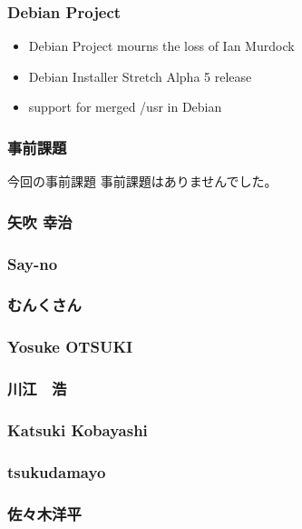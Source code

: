 \documentclass[cjk,dvipdfmx,10pt,compress,%
hyperref={bookmarks=true,bookmarksnumbered=true,bookmarksopen=false,%
colorlinks=false,%
pdftitle={第 106 回 関西 Debian 勉強会},%
pdfauthor={倉敷・のがた・佐々木・かわだ},%
pdfsubject={資料},%
}]{beamer}
\begin{document}
\begin{frame}[fragile]
  \frametitle{Debian Project}
  \begin{itemize}
  \item Debian Project mourns the loss of Ian Murdock
  \item Debian Installer Stretch Alpha 5 release
  \item support for merged /usr in Debian
  \end{itemize}
\end{frame}



\begin{frame}[fragile]
  \frametitle{事前課題}
  \begin{block}{今回の事前課題}
    事前課題はありませんでした。
  \end{block}
\end{frame}


\begin{frame}
  \frametitle{ 矢吹 幸治 }
\end{frame}

\begin{frame}
  \frametitle{ Say-no }
\end{frame}

\begin{frame}
  \frametitle{ むんくさん }
\end{frame}

\begin{frame}
  \frametitle{ Yosuke OTSUKI }
\end{frame}

\begin{frame}
  \frametitle{ 川江　浩 }
\end{frame}

\begin{frame}
  \frametitle{ Katsuki Kobayashi }
\end{frame}

\begin{frame}
  \frametitle{ tsukudamayo }
\end{frame}

\begin{frame}
  \frametitle{ 佐々木洋平 }
\end{frame}
\end{document}
